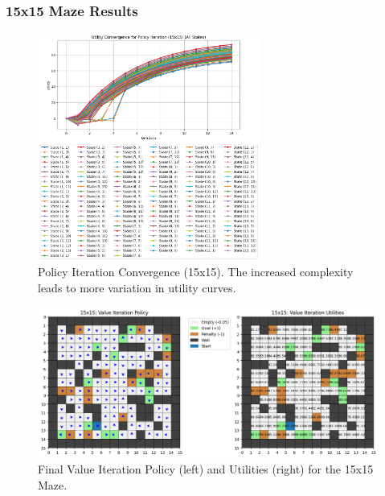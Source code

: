 \documentclass[11pt]{article}
\begin{document}
\subsubsection{15x15 Maze Results}
\begin{figure}[H]
    \centering
    \includegraphics[width=0.65\textwidth]{15x15_policy_iteration_convergence.png}
    \caption{Policy Iteration Convergence (15x15). The increased complexity leads to more variation in utility curves.}
    \label{fig:15x15_pi_conv}
\end{figure}

\begin{figure}[H]
    \centering
    \includegraphics[width=\textwidth]{15x15_value_iteration.png}
    \caption{Final Value Iteration Policy (left) and Utilities (right) for the 15x15 Maze.}
    \label{fig:15x15_vi_side_by_side}
\end{figure}
\end{document}
